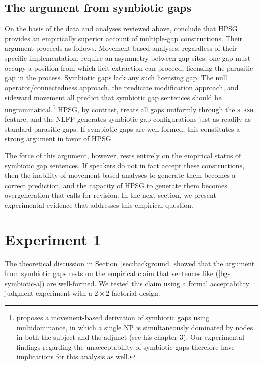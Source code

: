 \documentclass[12pt]{article}
\begin{document}
\subsection{The argument from symbiotic gaps}\label{sec:argument}

On the basis of the data and analyses reviewed above, \citeauthor{levine2003} conclude that HPSG provides an empirically superior account of multiple-gap constructions. Their argument proceeds as follows. Movement-based analyses, regardless of their specific implementation, require an asymmetry between gap sites: one gap must occupy a position from which licit extraction can proceed, licensing the parasitic gap in the process. Symbiotic gaps lack any such licensing gap. The null operator/connectedness approach, the predicate modification approach, and sideward movement all predict that symbiotic gap sentences should be ungrammatical.\footnote{\citet{obrien2017} proposes a movement-based derivation of symbiotic gaps using multidominance, in which a single NP is simultaneously dominated by nodes in both the subject and the adjunct (see his chapter 3). Our experimental findings regarding the unacceptability of symbiotic gaps therefore have implications for this analysis as well.} HPSG, by contrast, treats all gaps uniformly through the \textsc{slash} feature, and the NLFP generates symbiotic gap configurations just as readily as standard parasitic gaps. If symbiotic gaps are well-formed, this constitutes a strong argument in favor of HPSG.

The force of this argument, however, rests entirely on the empirical status of symbiotic gap sentences. If speakers do not in fact accept these constructions, then the inability of movement-based analyses to generate them becomes a correct prediction, and the capacity of HPSG to generate them becomes overgeneration that calls for revision. In the next section, we present experimental evidence that addresses this empirical question.


\section{Experiment 1}\label{sec:experiment}

The theoretical discussion in Section~\ref{sec:background} showed that the argument from symbiotic gaps rests on the empirical claim that sentences like (\ref{bg-symbiotic-a}) are well-formed. We tested this claim using a formal acceptability judgment experiment with a $2 \times 2$ factorial design.
\end{document}
